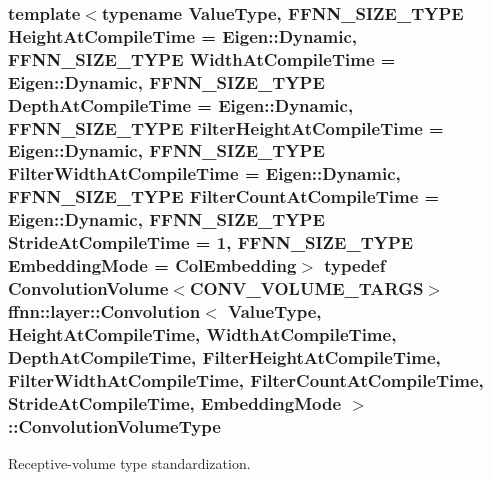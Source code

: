 \hypertarget{classffnn_1_1layer_1_1_convolution_a7513a4676d627e4310b1ea582b73e7eb}{
\subsubsection[{Convolution\-Volume\-Type}]{\setlength{\rightskip}{0pt plus 5cm}template$<$typename Value\-Type, F\-F\-N\-N\-\_\-\-S\-I\-Z\-E\-\_\-\-T\-Y\-P\-E Height\-At\-Compile\-Time = Eigen\-::\-Dynamic, F\-F\-N\-N\-\_\-\-S\-I\-Z\-E\-\_\-\-T\-Y\-P\-E Width\-At\-Compile\-Time = Eigen\-::\-Dynamic, F\-F\-N\-N\-\_\-\-S\-I\-Z\-E\-\_\-\-T\-Y\-P\-E Depth\-At\-Compile\-Time = Eigen\-::\-Dynamic, F\-F\-N\-N\-\_\-\-S\-I\-Z\-E\-\_\-\-T\-Y\-P\-E Filter\-Height\-At\-Compile\-Time = Eigen\-::\-Dynamic, F\-F\-N\-N\-\_\-\-S\-I\-Z\-E\-\_\-\-T\-Y\-P\-E Filter\-Width\-At\-Compile\-Time = Eigen\-::\-Dynamic, F\-F\-N\-N\-\_\-\-S\-I\-Z\-E\-\_\-\-T\-Y\-P\-E Filter\-Count\-At\-Compile\-Time = Eigen\-::\-Dynamic, F\-F\-N\-N\-\_\-\-S\-I\-Z\-E\-\_\-\-T\-Y\-P\-E Stride\-At\-Compile\-Time = 1, F\-F\-N\-N\-\_\-\-S\-I\-Z\-E\-\_\-\-T\-Y\-P\-E Embedding\-Mode = Col\-Embedding$>$ typedef {\bf Convolution\-Volume}$<${\bf C\-O\-N\-V\-\_\-\-V\-O\-L\-U\-M\-E\-\_\-\-T\-A\-R\-G\-S}$>$ {\bf ffnn\-::layer\-::\-Convolution}$<$ Value\-Type, Height\-At\-Compile\-Time, Width\-At\-Compile\-Time, Depth\-At\-Compile\-Time, Filter\-Height\-At\-Compile\-Time, Filter\-Width\-At\-Compile\-Time, Filter\-Count\-At\-Compile\-Time, Stride\-At\-Compile\-Time, {\bf Embedding\-Mode} $>$\-::{\bf Convolution\-Volume\-Type}}}\label{classffnn_1_1layer_1_1_convolution_a7513a4676d627e4310b1ea582b73e7eb}


Receptive-\/volume type standardization. 

